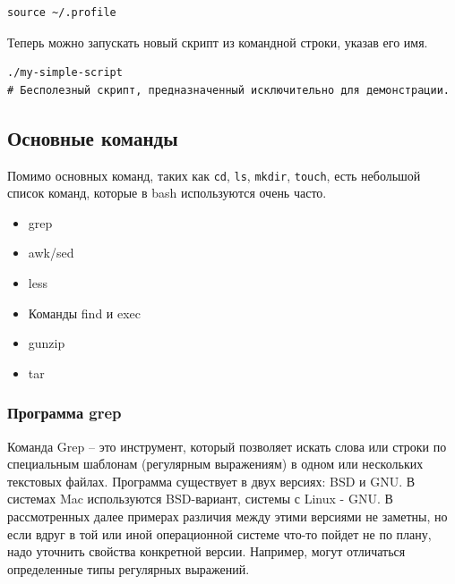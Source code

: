 \documentclass[12pt]{article}
\providecommand{\tightlist}{%
  \setlength{\itemsep}{0pt}\setlength{\parskip}{0pt}}
\begin{document}
\begin{verbatim}
source ~/.profile
\end{verbatim}

Теперь можно запускать новый скрипт из командной строки, указав его имя.

\begin{verbatim}
./my-simple-script
# Бесполезный скрипт, предназначенный исключительно для демонстрации.
\end{verbatim}

\hypertarget{Common-Commands}{%
\subsection{\texorpdfstring{\protect\hyperlink{Common-Commands}{}Основные
команды}{Основные команды}}\label{Common-Commands}}

Помимо основных команд, таких как \texttt{cd}, \texttt{ls},
\texttt{mkdir}, \texttt{touch}, есть небольшой список команд,
которые в bash используются очень часто.

\begin{itemize}
\tightlist
\item
  grep
\item
  awk/sed
\item
  less
\item
  Команды find и exec
\item
  gunzip
\item
  tar
\end{itemize}

\hypertarget{grep}{%
  \subsubsection{\texorpdfstring{\protect\hyperlink{grep}{}Программа grep}{Программа grep}}\label{grep}}

Команда Grep -- это инструмент, который позволяет искать слова или строки по специальным шаблонам (регулярным выражениям) в одном или
нескольких текстовых файлах. Программа существует в двух версиях: BSD и GNU. В
системах Mac используются BSD-вариант, системы с Linux - GNU. В
рассмотренных далее примерах различия между этими версиями не заметны,
но если вдруг в той или иной операционной системе что-то пойдет не по
плану, надо уточнить свойства конкретной версии. Например, могут
отличаться определенные типы регулярных выражений.
\end{document}
